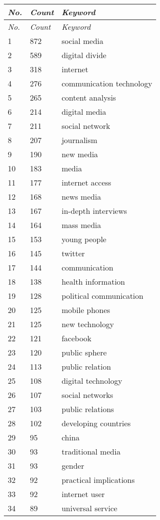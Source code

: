 \documentclass{tufte-handout}
\begin{document}
\begin{hangparas}{.25in}{1}
\begin{fullwidth}
\tabulinesep=1.1mm
{\begin{longtabu} to 1.25\textwidth { X[l] X[c] X[c]} 
\emph{No.} & \emph{Count} & \emph{Keyword} \\
\endfirsthead
\emph{No.} & \emph{Count} & \emph{Keyword} \\
 & 872 & ­­social media \\
2 & 589 & digital divide \\
3 & 318 & internet \\
4 & 276 & communication technology \\
5 & 265 & content analysis \\
6 & 214 & digital media \\
7 & 211 & social network \\
8 & 207 & journalism \\
9 & 190 & new media \\
10 & 183 & media \\
11 & 177 & internet access \\
12 & 168 & news media \\
13 & 167 & in-depth interviews \\
14 & 164 & mass media \\
15 & 153 & young people \\
16 & 145 & twitter \\
17 & 144 & communication \\
18 & 138 & health information \\
19 & 128 & political communication \\
20 & 125 & mobile phones \\
21 & 125 & new technology \\
22 & 121 & facebook \\
23 & 120 & public sphere \\
24 & 113 & public relation \\
25 & 108 & digital technology \\
26 & 107 & social networks \\
27 & 103 & public relations \\
28 & 102 & developing countries \\
29 & 95 & china \\
30 & 93 & traditional media \\
31 & 93 & gender \\
32 & 92 & practical implications \\
33 & 92 & internet user \\
34 & 89 & universal service \\

\end{longtabu}}
\end{fullwidth}
\end{hangparas}
\end{document}
